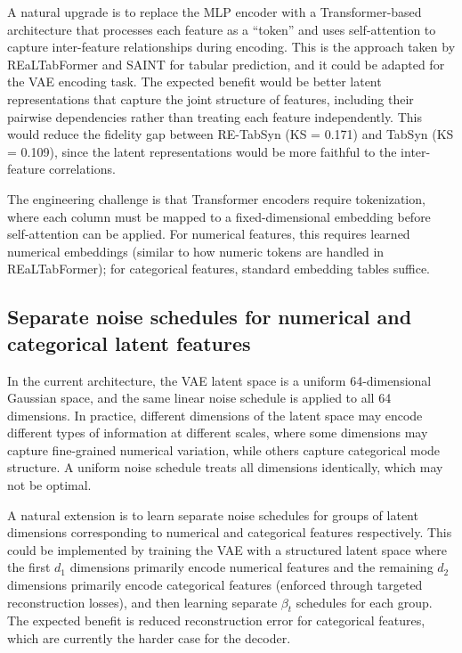 A natural upgrade is to replace the MLP encoder with a Transformer-based architecture that processes each feature as a ``token'' and uses self-attention to capture inter-feature relationships during encoding. This is the approach taken by REaLTabFormer \cite{solatorio2023realtabformer} and SAINT \cite{somepalli2021saint} for tabular prediction, and it could be adapted for the VAE encoding task. The expected benefit would be better latent representations that capture the joint structure of features, including their pairwise dependencies rather than treating each feature independently. This would reduce the fidelity gap between RE-TabSyn (KS = 0.171) and TabSyn (KS = 0.109), since the latent representations would be more faithful to the inter-feature correlations.

The engineering challenge is that Transformer encoders require tokenization, where each column must be mapped to a fixed-dimensional embedding before self-attention can be applied. For numerical features, this requires learned numerical embeddings (similar to how numeric tokens are handled in REaLTabFormer); for categorical features, standard embedding tables suffice.

\subsection{Separate noise schedules for numerical and categorical latent features}

In the current architecture, the VAE latent space is a uniform 64-dimensional Gaussian space, and the same linear noise schedule is applied to all 64 dimensions. In practice, different dimensions of the latent space may encode different types of information at different scales, where some dimensions may capture fine-grained numerical variation, while others capture categorical mode structure. A uniform noise schedule treats all dimensions identically, which may not be optimal.

A natural extension is to learn separate noise schedules for groups of latent dimensions corresponding to numerical and categorical features respectively. This could be implemented by training the VAE with a structured latent space where the first $d_1$ dimensions primarily encode numerical features and the remaining $d_2$ dimensions primarily encode categorical features (enforced through targeted reconstruction losses), and then learning separate $\beta_t$ schedules for each group. The expected benefit is reduced reconstruction error for categorical features, which are currently the harder case for the decoder.

